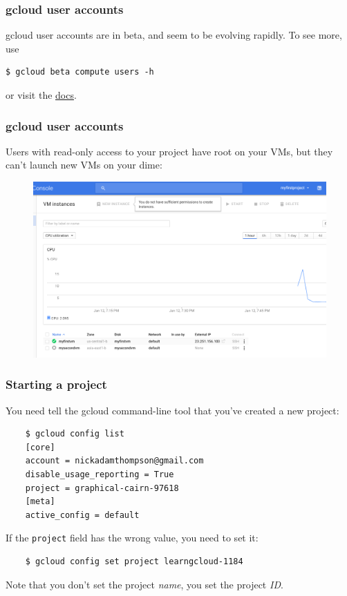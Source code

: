 \documentclass[9pt]{beamer}
\begin{document}
\begin{frame}[fragile]
  \frametitle{gcloud user accounts}
  gcloud user accounts are in beta, and seem to be evolving rapidly. To see more, use
  \begin{verbatim}
$ gcloud beta compute users -h
  \end{verbatim}
or visit the \href{https://cloud.google.com/compute/docs/access/user-accounts/}{docs}.
\end{frame}

\begin{frame}[fragile]
  \frametitle{gcloud user accounts}
  Users with read-only access to your project have root on your VMs, but they can't launch new VMs on your dime:
  \begin{figure}
    \includegraphics[scale=0.2]{figures/CantCreateVM.png}
  \end{figure}
\end{frame}


\begin{frame}[fragile]
  \frametitle{Starting a project}
  You need tell the gcloud command-line tool that you've created a new project:
  \begin{verbatim}
    $ gcloud config list
    [core]
    account = nickadamthompson@gmail.com
    disable_usage_reporting = True
    project = graphical-cairn-97618 
    [meta]
    active_config = default
  \end{verbatim}
  If the \texttt{project} field has the wrong value, you need to set it:
  \begin{verbatim}
    $ gcloud config set project learngcloud-1184
  \end{verbatim}
  Note that you don't set the project \emph{name}, you set the project \emph{ID}.
\end{frame}
\end{document}

